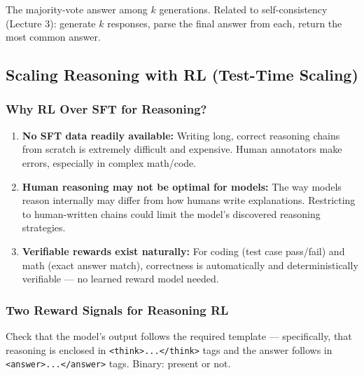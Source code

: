 \documentclass[11pt, a4paper]{article}
\begin{document}
\begin{defbox}
The majority-vote answer among $k$ generations. Related to self-consistency (Lecture 3): generate $k$ responses, parse the final answer from each, return the most common answer.
\end{defbox}

\subsection{Scaling Reasoning with RL (Test-Time Scaling)}

\subsubsection{Why RL Over SFT for Reasoning?}

\begin{defbox}
\begin{enumerate}[leftmargin=1.5em]
  \item \textbf{No SFT data readily available:} Writing long, correct reasoning chains from scratch is extremely difficult and expensive. Human annotators make errors, especially in complex math/code.
  \item \textbf{Human reasoning may not be optimal for models:} The way models reason internally may differ from how humans write explanations. Restricting to human-written chains could limit the model's discovered reasoning strategies.
  \item \textbf{Verifiable rewards exist naturally:} For coding (test case pass/fail) and math (exact answer match), correctness is automatically and deterministically verifiable --- no learned reward model needed.
\end{enumerate}
\end{defbox}

\subsubsection{Two Reward Signals for Reasoning RL}

\begin{defbox}
Check that the model's output follows the required template --- specifically, that reasoning is enclosed in \texttt{<think>...</think>} tags and the answer follows in \texttt{<answer>...</answer>} tags. Binary: present or not.
\end{defbox}
\end{document}
